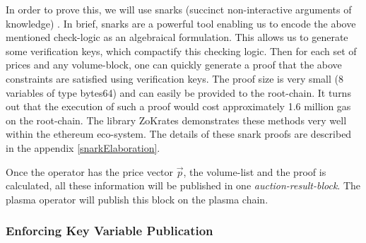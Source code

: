 \documentclass[11pt,parskip=full]{scrartcl}%
\begin{document}
In order to prove this, we will use snarks (succinct non-interactive arguments of knowledge) \cite{snarks}. 
In brief, snarks are a powerful tool enabling us to encode the above mentioned check-logic as an algebraical formulation. 
This allows us to generate some verification keys, which compactify this checking logic. 
Then for each set of prices and any volume-block, one can quickly generate a proof that the above constraints are satisfied using verification keys. 
The proof size is very small (8 variables of type bytes64) and can easily be provided to the root-chain. 
It turns out that the execution of such a proof would cost approximately 1.6 million gas on the root-chain. 
The library ZoKrates \cite{zokrates} demonstrates these methods very well within the ethereum eco-system. 
The details of these snark proofs are described in the appendix \ref{snarkElaboration}.


Once the operator has the price vector $\vec{p}$, the volume-list and the proof is calculated, all these information will be published in one \emph{auction-result-block}. The plasma operator will publish this block on the plasma chain. 


\subsubsection{Enforcing Key Variable Publication}
\end{document}
